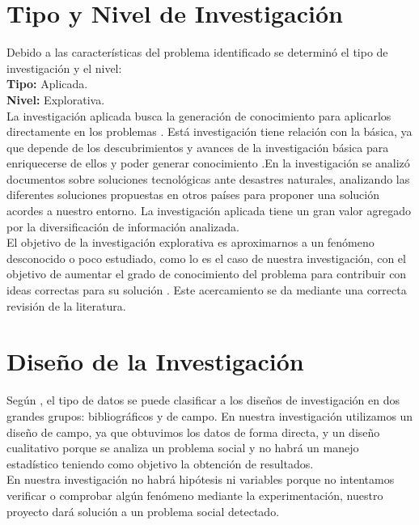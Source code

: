 \documentclass[11pt,openany]{book}
\begin{document}
	\section{Tipo y Nivel de Investigación}
	Debido a las características del problema identificado se determinó el tipo de investigación y el nivel:\\[0.25cm]
	\textbf{Tipo: }Aplicada. \\
	\textbf{Nivel: }Explorativa. \\ [0.25 cm]
	La investigación aplicada busca la generación de conocimiento para aplicarlos directamente en los problemas \cite{lozada2014}. Está investigación tiene relación con la básica, ya que  depende de los descubrimientos y avances de la investigación básica para enriquecerse de ellos y poder generar conocimiento \cite{grajales2000}.En la investigación se analizó documentos sobre soluciones tecnológicas ante desastres naturales, analizando las diferentes soluciones propuestas en otros países para proponer una solución acordes a nuestro entorno. La investigación aplicada tiene un gran valor agregado por la diversificación de información analizada.\\ [0.25 cm]
	El objetivo de la investigación explorativa es aproximarnos a un fenómeno desconocido o poco estudiado, como lo es el caso de nuestra investigación,  con el objetivo de aumentar el grado de conocimiento del problema para contribuir con ideas correctas para su solución \cite{grajales2000}. Este acercamiento se da mediante una correcta revisión de la literatura. \\

	\section{Diseño de la Investigación}
	Según \cite{sabino}, el tipo de datos se puede clasificar a los diseños de investigación en dos grandes grupos: bibliográficos y de campo. En nuestra investigación utilizamos un diseño de campo, ya que obtuvimos los datos de forma directa, y un diseño cualitativo porque se analiza un problema social y no habrá un manejo  estadístico teniendo como objetivo la obtención de resultados.\\
	En nuestra investigación no habrá hipótesis ni variables porque no intentamos verificar o comprobar algún fenómeno mediante la experimentación, nuestro proyecto dará solución a un problema social detectado.
	\newpage
\end{document}

